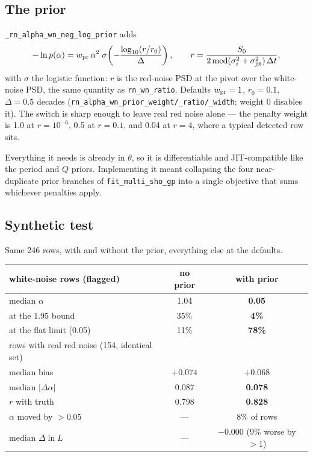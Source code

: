\documentclass[11pt]{article}
\newcommand{\code}[1]{\texttt{#1}}
\begin{document}
\subsection{The prior}

\code{\_rn\_alpha\_wn\_neg\_log\_prior} adds
\begin{equation}
-\ln p(\alpha) = w_{\rm pr}\,\alpha^2\;\sigma\!\left(-\frac{\log_{10}(r/r_0)}{\Delta}\right),
\qquad r = \frac{S_0}{2\,\mathrm{med}(\sigma_i^2 + \sigma_{\rm jit}^2)\,\Delta t},
\end{equation}
with $\sigma$ the logistic function: $r$ is the red-noise PSD at the pivot over the
white-noise PSD, the same quantity as \code{rn\_wn\_ratio}. Defaults
$w_{\rm pr} = 1$, $r_0 = 0.1$, $\Delta = 0.5$ decades
(\code{rn\_alpha\_wn\_prior\_weight/\_ratio/\_width}; weight 0 disables it). The switch is
sharp enough to leave real red noise alone --- the penalty weight is 1.0 at $r = 10^{-6}$,
0.5 at $r = 0.1$, and 0.04 at $r = 4$, where a typical detected row sits.

Everything it needs is already in $\theta$, so it is differentiable and JIT-compatible
like the period and $Q$ priors. Implementing it meant collapsing the four near-duplicate
prior branches of \code{fit\_multi\_sho\_gp} into a single objective that sums whichever
penalties apply.

\subsection{Synthetic test}

Same 246 rows, with and without the prior, everything else at the defaults.

\begin{center}
\begin{tabular}{lcc}
\toprule
white-noise rows (flagged) & no prior & with prior \\
\midrule
median $\alpha$              & 1.04 & \textbf{0.05} \\
at the 1.95 bound            & 35\% & \textbf{4\%} \\
at the flat limit (0.05)     & 11\% & \textbf{78\%} \\
\midrule
rows with real red noise (154, identical set) & & \\
\midrule
median bias                  & $+0.074$ & $+0.068$ \\
median $|\Delta\alpha|$      & 0.087 & \textbf{0.078} \\
$r$ with truth               & 0.798 & \textbf{0.828} \\
$\alpha$ moved by $>0.05$    & --- & 8\% of rows \\
median $\Delta\ln L$         & --- & $-0.000$ (9\% worse by $>1$) \\
\bottomrule
\end{tabular}
\end{center}
\end{document}
